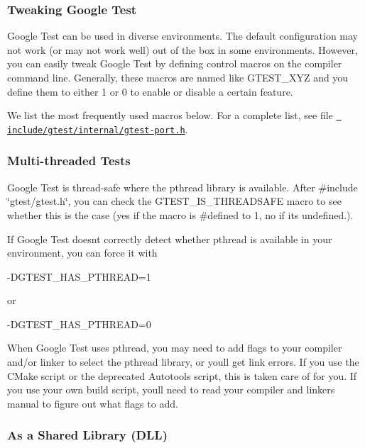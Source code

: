 \subsubsection*{Tweaking Google Test}

Google Test can be used in diverse environments. The default configuration may not work (or may not work well) out of the box in some environments. However, you can easily tweak Google Test by defining control macros on the compiler command line. Generally, these macros are named like {\ttfamily G\+T\+E\+S\+T\+\_\+\+X\+YZ} and you define them to either 1 or 0 to enable or disable a certain feature.

We list the most frequently used macros below. For a complete list, see file \href{https://github.com/google/googletest/blob/master/googletest/include/gtest/internal/gtest-port.h}{\texttt{ include/gtest/internal/gtest-\/port.\+h}}.

\subsubsection*{Multi-\/threaded Tests}

Google Test is thread-\/safe where the pthread library is available. After {\ttfamily \#include \char`\"{}gtest/gtest.\+h\char`\"{}}, you can check the {\ttfamily G\+T\+E\+S\+T\+\_\+\+I\+S\+\_\+\+T\+H\+R\+E\+A\+D\+S\+A\+FE} macro to see whether this is the case (yes if the macro is {\ttfamily \#defined} to 1, no if it\textquotesingle{}s undefined.).

If Google Test doesn\textquotesingle{}t correctly detect whether pthread is available in your environment, you can force it with \begin{DoxyVerb}-DGTEST_HAS_PTHREAD=1
\end{DoxyVerb}


or \begin{DoxyVerb}-DGTEST_HAS_PTHREAD=0
\end{DoxyVerb}


When Google Test uses pthread, you may need to add flags to your compiler and/or linker to select the pthread library, or you\textquotesingle{}ll get link errors. If you use the C\+Make script or the deprecated Autotools script, this is taken care of for you. If you use your own build script, you\textquotesingle{}ll need to read your compiler and linker\textquotesingle{}s manual to figure out what flags to add.

\subsubsection*{As a Shared Library (D\+LL)}

